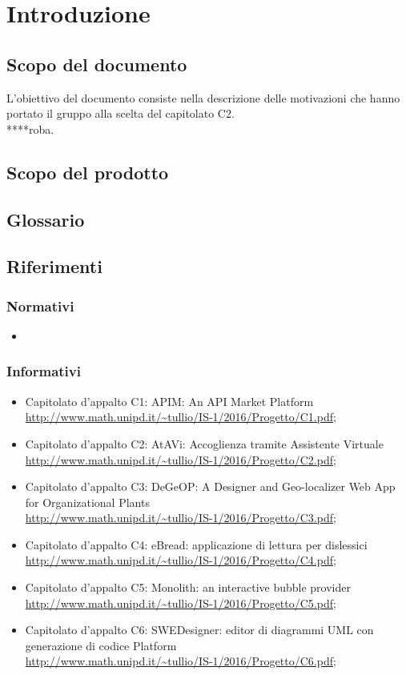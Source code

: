 \section {Introduzione}
	\subsection {Scopo del documento}
L'obiettivo del documento consiste nella descrizione delle motivazioni che 				hanno portato il gruppo \GRUPPO alla scelta del capitolato C2.  \\
****roba. 
	\subsection {Scopo del prodotto}
		\SCOPO
	\subsection {Glossario}
		\GLOSSARIO
	\subsection {Riferimenti}
		\subsubsection {Normativi}
			\begin {itemize}
				\item \NPdoc
			\end {itemize}
		\subsubsection {Informativi}
			\begin {itemize}
				\item Capitolato d'appalto C1: APIM: An API Market Platform \\
					\url {http://www.math.unipd.it/~tullio/IS-1/2016/Progetto/C1.pdf};
				\item Capitolato d'appalto C2: AtAVi: Accoglienza tramite Assistente Virtuale \\
				\url {http://www.math.unipd.it/~tullio/IS-1/2016/Progetto/C2.pdf};
				\item Capitolato d'appalto C3: DeGeOP: A Designer and Geo-localizer Web App for Organizational Plants \\
					\url {http://www.math.unipd.it/~tullio/IS-1/2016/Progetto/C3.pdf};
					\item Capitolato d'appalto C4: eBread: applicazione di lettura per dislessici  \\
					\url {http://www.math.unipd.it/~tullio/IS-1/2016/Progetto/C4.pdf};
					\item Capitolato d'appalto C5: Monolith: an interactive bubble provider \\
					\url {http://www.math.unipd.it/~tullio/IS-1/2016/Progetto/C5.pdf};
									\item Capitolato d'appalto C6: SWEDesigner: editor di diagrammi UML con generazione di codice Platform \\
					\url {http://www.math.unipd.it/~tullio/IS-1/2016/Progetto/C6.pdf};
					
				
			\end {itemize}
		
		